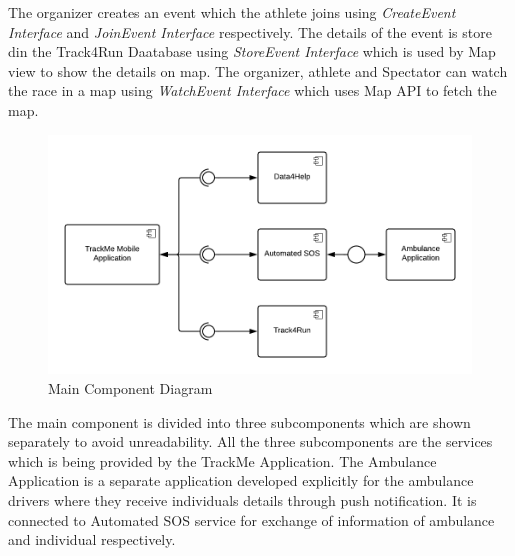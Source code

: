 The organizer creates an event which the athlete joins using \textit{CreateEvent Interface} and \textit{JoinEvent Interface} respectively. The details of the event is store din the Track4Run Daatabase using \textit{StoreEvent Interface} which is used by Map view to show the details on map. The organizer, athlete and Spectator can watch the race in a map using \textit{WatchEvent Interface} which uses Map API to fetch the map.
\begin{figure}[H]
	\begin{center}
		\includegraphics[width=\textwidth]{./DD_Diagrams/Component.png}
      \caption{Main Component Diagram}
        \label{TrackMe_c0}
	\end{center}
\end{figure}
The main component is divided into three subcomponents which are shown separately to avoid unreadability. All the three subcomponents are the services which is being provided by the TrackMe Application.\newline
The Ambulance Application is a separate application developed explicitly for the ambulance drivers where they receive individuals details through push notification. It is connected to Automated SOS service for exchange of information of ambulance and individual respectively.